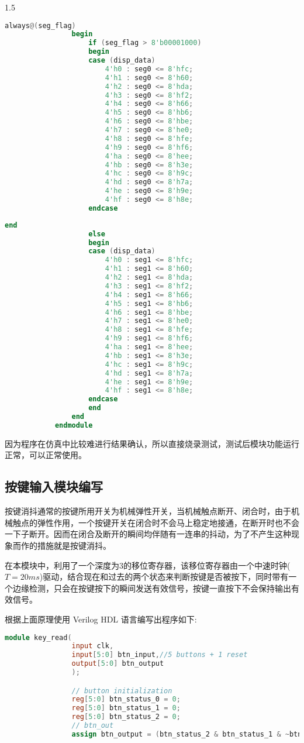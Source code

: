 {\begin{spacing}{1.5}
\begin{lstlisting}[language=Verilog]
				always@(seg_flag)
				begin
					if (seg_flag > 8'b00001000)
					begin
					case (disp_data)
						4'h0 : seg0 <= 8'hfc;
						4'h1 : seg0 <= 8'h60;
						4'h2 : seg0 <= 8'hda;
						4'h3 : seg0 <= 8'hf2;
						4'h4 : seg0 <= 8'h66;
						4'h5 : seg0 <= 8'hb6;
						4'h6 : seg0 <= 8'hbe;
						4'h7 : seg0 <= 8'he0;
						4'h8 : seg0 <= 8'hfe;
						4'h9 : seg0 <= 8'hf6;
						4'ha : seg0 <= 8'hee;
						4'hb : seg0 <= 8'h3e;
						4'hc : seg0 <= 8'h9c;
						4'hd : seg0 <= 8'h7a;
						4'he : seg0 <= 8'h9e;
						4'hf : seg0 <= 8'h8e;
					endcase
			\end{lstlisting}
			\begin{lstlisting}[language=Verilog]
					end
					else
					begin
					case (disp_data)
						4'h0 : seg1 <= 8'hfc;
						4'h1 : seg1 <= 8'h60;
						4'h2 : seg1 <= 8'hda;
						4'h3 : seg1 <= 8'hf2;
						4'h4 : seg1 <= 8'h66;
						4'h5 : seg1 <= 8'hb6;
						4'h6 : seg1 <= 8'hbe;
						4'h7 : seg1 <= 8'he0;
						4'h8 : seg1 <= 8'hfe;
						4'h9 : seg1 <= 8'hf6;
						4'ha : seg1 <= 8'hee;
						4'hb : seg1 <= 8'h3e;
						4'hc : seg1 <= 8'h9c;
						4'hd : seg1 <= 8'h7a;
						4'he : seg1 <= 8'h9e;
						4'hf : seg1 <= 8'h8e;
					endcase
					end
				end
			endmodule
			\end{lstlisting}
			因为程序在仿真中比较难进行结果确认，所以直接烧录测试，测试后模块功能运行正常，可以正常使用。
		\subsection{按键输入模块编写}
			按键消抖通常的按键所用开关为机械弹性开关，当机械触点断开、闭合时，由于机械触点的弹性作用，一个按键开关在闭合时不会马上稳定地接通，在断开时也不会一下子断开。因而在闭合及断开的瞬间均伴随有一连串的抖动，为了不产生这种现象而作的措施就是按键消抖。

			在本模块中，利用了一个深度为3的移位寄存器，该移位寄存器由一个中速时钟($T=20ms$)驱动，结合现在和过去的两个状态来判断按键是否被按下，同时带有一个边缘检测，只会在按键按下的瞬间发送有效信号，按键一直按下不会保持输出有效信号。

			根据上面原理使用 Verilog HDL 语言编写出程序如下:
			\begin{lstlisting}[language=Verilog]
			module key_read(
				input clk,
				input[5:0] btn_input,//5 buttons + 1 reset
				output[5:0] btn_output
				);

				// button initialization
				reg[5:0] btn_status_0 = 0;
				reg[5:0] btn_status_1 = 0;
				reg[5:0] btn_status_2 = 0;
				// btn_out
				assign btn_output = (btn_status_2 & btn_status_1 & ~btn_status_0) | (btn_status_2 & btn_status_1 & btn_status_0) | (~btn_status_2 & btn_status_1 & btn_status_0);
				

\end{lstlisting}
\end{spacing}}
